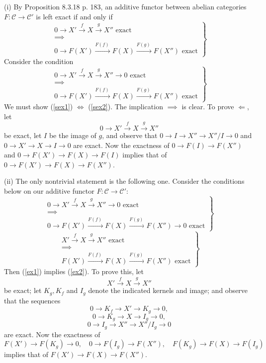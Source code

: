 \documentclass[12pt]{article}
\theoremstyle{remark}%
\newcommand{\C}{\mathcal C}
\begin{document}
(i) By Proposition 8.3.18 p. 183, an additive functor between abelian categories $F:\C\to\C'$ is left exact if and only if 
\begin{equation}\label{sex1}
\left.
\begin{matrix}
0\to X'\overset{f}{\to}X\overset{g}{\to}X''\text{ exact }\\ 
\implies\\ 
0\to F(X')\overset{F(f)\ }{\longrightarrow}F(X)\overset{F(g)\ }{\longrightarrow}F(X'')\text{ exact}
\end{matrix}
\right\}
\end{equation} 
Consider the condition 
\begin{equation}\label{sex2}
\left.
\begin{matrix}
0\to X'\overset{f}{\to}X\overset{g}{\to}X''\to0\text{ exact }\\ 
\implies\\ 
0\to F(X')\overset{F(f)\ }{\longrightarrow}F(X)\overset{F(g)\ }{\longrightarrow}F(X'')\text{ exact}
\end{matrix}
\right\}
\end{equation}
We must show (\ref{sex1}) $\iff$ (\ref{sex2}). The implication $\implies$ is clear. To prove $\Longleftarrow$, let 
$$
0\to X'\overset{f}{\to}X\overset{g}{\to}X''
$$
be exact, let $I$ be the image of $g$, and observe that $0\to I\to X''\to X''/I\to0$ and $0\to X'\to X\to I\to0$ are exact. Now the exactness of $0\to F(I)\to F(X'')$ and $0\to F(X')\to F(X)\to F(I)$ implies that of $0\to F(X')\to F(X)\to F(X'')$. 

(ii) The only nontrivial statement is the following one. Consider the conditions below on our additive functor $F:\C\to\C'$: 
\begin{equation}\label{ex1}
\left.
\begin{matrix}
0\to X'\overset{f}{\to}X\overset{g}{\to}X''\to0\text{ exact }\\ 
\implies\\ 
0\to F(X')\overset{F(f)\ }{\longrightarrow}F(X)\overset{F(g)\ }{\longrightarrow}F(X'')\to0\text{ exact}
\end{matrix}
\right\}
\end{equation}  
\begin{equation}\label{ex2}
\left.
\begin{matrix}
X'\overset{f}{\to}X\overset{g}{\to}X''\text{ exact }\\ 
\implies\\ 
F(X')\overset{F(f)\ }{\longrightarrow}F(X)\overset{F(g)\ }{\longrightarrow}F(X'')\text{ exact}
\end{matrix}
\right\}
\end{equation} 
Then (\ref{ex1}) implies (\ref{ex2}). To prove this, let 
$$
X'\overset{f}{\to}X\overset{g}{\to}X''
$$
be exact; let $K_g,K_f$ and $I_g$ denote the indicated kernels and image; and observe that the sequences 
$$
0\to K_f\to X'\to K_g\to 0,
$$
$$
0\to K_g\to X\to I_g\to 0,
$$
$$
0\to I_g\to X''\to X''/I_g\to 0
$$
are exact. Now the exactness of 
$$
F(X')\to F(K_g)\to0,\quad 0\to F(I_g)\to F(X''),\quad F(K_g)\to F(X)\to F(I_g)
$$
implies that of $F(X')\to F(X)\to F(X'')$. 
%
\end{document}
